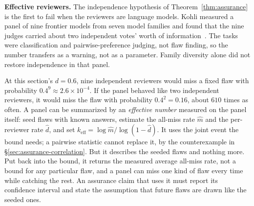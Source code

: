 \begin{remark}
\textbf{Effective reviewers.}
\pdstatus{\Vision}{}
The independence hypothesis of
Theorem~\ref{thm:assurance} is the first to fail when the reviewers are
language models. Kohli measured a panel of nine frontier models from seven
model families and found that the nine judges carried about two independent
votes' worth of information~. The tasks were
classification and pairwise-preference judging, not flaw finding, so the
number transfers as a warning, not as a parameter. Family diversity alone did
not restore independence in that panel.

At this section's $d=0.6$, nine independent reviewers would miss a fixed flaw
with probability $0.4^9\approx2.6\times10^{-4}$. If the panel behaved like two
independent reviewers, it would miss the flaw with probability $0.4^2=0.16$,
about $610$ times as often. A panel can be summarized by an \emph{effective
number} measured on the panel itself: seed flaws with known answers, estimate
the all-miss rate $\hat m$ and the per-reviewer rate $\hat d$, and set
$k_{\mathrm{eff}}=\log\hat m/\log(1-\hat d)$. It uses the joint event the
bound needs; a pairwise statistic cannot replace it, by the counterexample in
\S\ref{sec:assurance-correlation}. But it describes the seeded flaws and
nothing more. Put back into the bound, it returns the measured average
all-miss rate, not a bound for any particular flaw, and a panel can miss one
kind of flaw every time while catching the rest. An assurance claim that uses
it must report its confidence interval and state the assumption that future
flaws are drawn like the seeded ones.
\end{remark}

\pdexercisepointerone{\ref{ex:he-effective-reviewers}}{\pageref{ex:he-effective-reviewers}}
